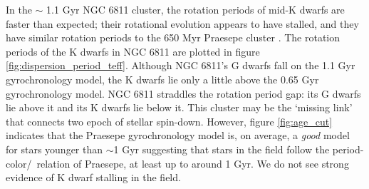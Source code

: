 In the $\sim$ 1.1 Gyr NGC 6811 cluster, the rotation periods of mid-K dwarfs
are faster than expected; their rotational evolution appears to have stalled,
and they have similar rotation periods to the 650 Myr Praesepe cluster
\citep{curtis2019}.
The rotation periods of the K dwarfs in NGC 6811 are plotted in figure
\ref{fig:dispersion_period_teff}.
Although NGC 6811's G dwarfs fall on the 1.1 Gyr gyrochronology model, the K
dwarfs lie only a little above the 0.65 Gyr gyrochronology model.
NGC 6811 straddles the rotation period gap: its G dwarfs lie above it and its
K dwarfs lie below it.
This cluster may be the `missing link' that connects two epoch of stellar
spin-down.
However, figure \ref{fig:age_cut} indicates that the Praesepe gyrochronology
model is, on average, a {\it good} model for stars younger than $\sim$1 Gyr
suggesting that stars in the field follow the period-color/\teff\ relation of
Praesepe, at least up to around 1 Gyr.
We do not see strong evidence of K dwarf stalling in the field.


